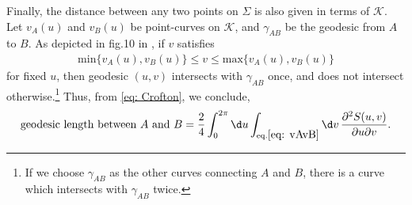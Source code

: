 \documentclass[12pt]{article}
\begin{document}
Finally, the distance between any two points on $\Sigma$ is also given in terms of $\mathcal K$.
Let $v_A(u)$ and $v_B(u)$ be point-curves on $\mathcal K$, and $\gamma_{AB}$ be the geodesic from $A$ to $B$.
As depicted in fig.10 in \cite{Czech:2015qta}, if $v$ satisfies
\begin{align}
	\mathrm{min}\{v_A(u),v_B(u)\}\leq v \leq \mathrm{max}\{v_A(u),v_B(u)\}
	\label{eq: vAvB}
\end{align}
for fixed $u$, then geodesic $(u,v)$ intersects with $\gamma_{AB}$ once, and does not intersect otherwise.\footnote{
If we choose $\gamma_{AB}$ as the other curves connecting $A$ and $B$, there is a curve which intersects with $\gamma_{AB}$ twice.}
Thus, from \eqref{eq: Crofton}, we conclude,
\begin{align}
	\mbox{geodesic length between $A$ and $B$} = 
	\frac{2}{4}\int_0^{2\pi}\d u\int_{\mathrm{eq}.\eqref{eq: vAvB}}\d v\,\frac{\partial^2 S(u,v)}{\partial u\partial v}.
\end{align}































 

\end{document}
